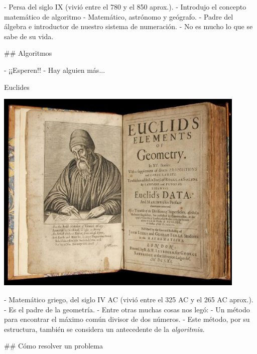 \pause

- Persa del siglo IX (vivió entre el 780 y el 850 aprox.).
- Introdujo el concepto matemático de algoritmo
- Matemático, astrónomo y geógrafo. 
- Padre del álgebra e introductor de nuestro sistema de numeración.
- No es mucho lo que se sabe de su vida.

## Algoritmos

\bgncolumns
{}
\vspace{-1em}

- ¡¡Esperen!!
- Hay alguien más...

\pause

\bgnblockgood[wd=.8\textwidth]
Euclides
\trmblockgood

\includegraphics[width=0.9\textwidth,valign=t]{img/euclid-elements.jpg}
\trmcolumns

\pause

- Matemático griego, del siglo IV AC (vivió entre el 325 AC y el 265 AC aprox.).
- Es el padre de la geometría.
- Entre otras muchas cosas nos legó:
    - Un método para encontrar el máximo común divisor de dos números.
    - Este método, por su estructura, también se considera un antecedente de la \textit{algoritmia}.


## Cómo resolver un problema

\vspace{1em}
\begin{small}
\end{small}

